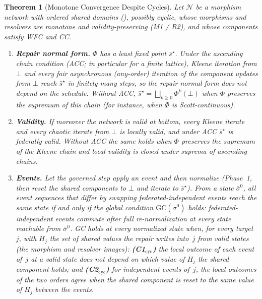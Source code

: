 \documentclass[11pt,a4paper]{article}
\theoremstyle{plain}
\newtheorem{theorem}{Theorem}[section]
\theoremstyle{definition}
\theoremstyle{remark}
\renewcommand{\_}{\textunderscore\allowbreak}
\begin{document}
\begin{theorem}[Monotone Convergence Despite Cycles]
\label{thm:monotone-cycles}
Let $\mathcal{N}$ be a morphism network with ordered shared domains
(), \emph{possibly cyclic}, whose morphisms and
resolvers are monotone and validity-preserving (M1 / R2), and whose components
satisfy WFC and CC.
\begin{enumerate}[leftmargin=*,nosep,label=(\alph*)]
\item \textbf{Repair normal form.}  $\Phi$ has a least fixed point
  $\bar{s}^{\star}$.  Under the ascending chain condition (ACC; in particular
  for a finite lattice), Kleene iteration from $\bot$ and every fair
  asynchronous (any-order) iteration of the component updates from $\bot$ reach
  $\bar{s}^{\star}$ in finitely many steps, so the repair normal form does not
  depend on the schedule.  Without ACC,
  $\bar{s}^{\star} = \bigsqcup_{k \geq 0} \Phi^k(\bot)$ when $\Phi$ preserves the
  supremum of this chain (for instance, when $\Phi$ is Scott-continuous).
\item \textbf{Validity.}  If moreover the network is valid at bottom, every
  Kleene iterate and every chaotic iterate from $\bot$ is locally valid, and
  under ACC $\bar{s}^{\star}$ is federally valid.  Without ACC the same holds
  when $\Phi$ preserves the supremum of the Kleene chain and local validity is
  closed under suprema of ascending chains.
\item \textbf{Events.}  Let the governed step apply an event and then
  normalize (Phase~1, then reset the shared components to $\bot$ and iterate to
  $\bar{s}^{\star}$).  From a state $\bar{\sigma}^0$, all event sequences that
  differ by swapping federated-independent events reach the same state if and
  only if the \emph{global condition} $\mathrm{GC}(\bar{\sigma}^0)$ holds:
  federated-independent events commute after full re-normalization at every
  state reachable from $\bar{\sigma}^0$.  GC holds at every normalized state
  when, for every target~$j$, with $H_j$ the set of shared values the repair
  writes into~$j$ from valid states (the morphism and resolver images):
  \textbf{(C1$_{\mathrm{cyc}}$)} the local outcome of each event of~$j$ at a
  valid state does not depend on which value of $H_j$ the shared component
  holds; and \textbf{(C2$_{\mathrm{cyc}}$)} for independent events of~$j$, the
  local outcomes of the two orders agree when the shared component is reset to
  the same value of $H_j$ between the events.
\end{enumerate}
\end{theorem}
\end{document}
